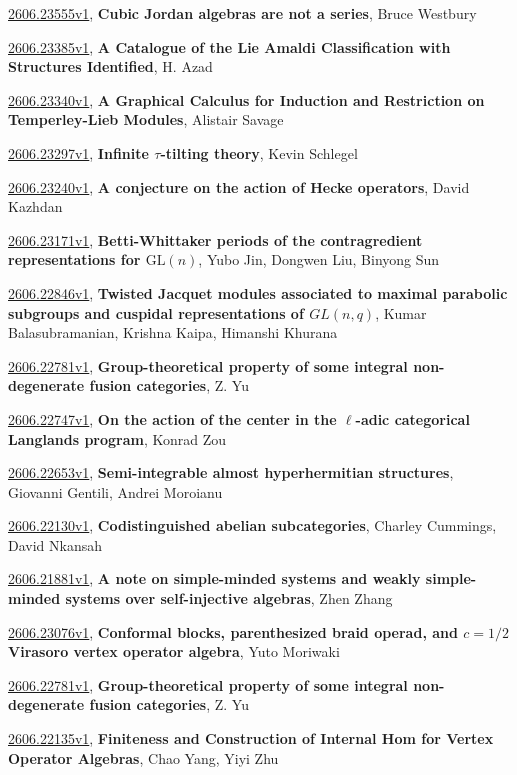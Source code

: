 \documentclass[9pt, a4paper]{article}
\theoremstyle{plain}
\theoremstyle{definition}
\theoremstyle{remark}
\newcommand{\arxiv}[3]{\href{https://arxiv.org/abs/#1}{#1}, \textbf{\textcolor{arxivblue}{#2}}, #3}
\begin{document}
\arxiv{2606.23555v1}{Cubic Jordan algebras are not a series}{Bruce Westbury}

\arxiv{2606.23385v1}{A Catalogue of the Lie Amaldi Classification with Structures Identified}{H. Azad}

\arxiv{2606.23340v1}{A Graphical Calculus for Induction and Restriction on Temperley-Lieb Modules}{Alistair Savage}

\arxiv{2606.23297v1}{Infinite $τ$-tilting theory}{Kevin Schlegel}

\arxiv{2606.23240v1}{A conjecture on the action of Hecke operators}{David Kazhdan}

\arxiv{2606.23171v1}{Betti-Whittaker periods of the contragredient representations for $\textrm{GL}(n)$}{Yubo Jin, Dongwen Liu, Binyong Sun}

\arxiv{2606.22846v1}{Twisted Jacquet modules associated to maximal parabolic subgroups and cuspidal representations of $GL(n, q)$}{Kumar Balasubramanian, Krishna Kaipa, Himanshi Khurana}

\arxiv{2606.22781v1}{Group-theoretical property of some integral non-degenerate fusion categories}{Z. Yu}

\arxiv{2606.22747v1}{On the action of the center in the $\ell$-adic categorical Langlands program}{Konrad Zou}

\arxiv{2606.22653v1}{Semi-integrable almost hyperhermitian structures}{Giovanni Gentili, Andrei Moroianu}

\arxiv{2606.22130v1}{Codistinguished abelian subcategories}{Charley Cummings, David Nkansah}

\arxiv{2606.21881v1}{A note on simple-minded systems and weakly simple-minded systems over self-injective algebras}{Zhen Zhang}

\arxiv{2606.23076v1}{Conformal blocks, parenthesized braid operad, and $c=1/2$ Virasoro vertex operator algebra}{Yuto Moriwaki}

\arxiv{2606.22781v1}{Group-theoretical property of some integral non-degenerate fusion categories}{Z. Yu}

\arxiv{2606.22135v1}{Finiteness and Construction of Internal Hom for Vertex Operator Algebras}{Chao Yang, Yiyi Zhu}

\end{document}
